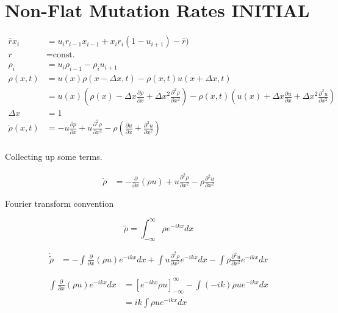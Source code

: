 \documentclass[a4paper]{article}
\begin{document}
\section{Non-Flat Mutation Rates INITIAL}

\begin{align*}
\bar{r} \dot{x}_i & = u_{i} r_{i-1} x_{i-1} + x_{i}  r_i ( 1- u_{i+1} ) - \bar{r} ) \\
r & = \text{const.} \\
\dot{\rho _i} & = u_i \rho _{i-1} - \rho _{i} u_{i+1} \\
\dot{\rho} (x, t) & = u(x) \rho (x - \Delta x, t) - \rho (x,t) u(x + \Delta x , t) \\
& = u(x) \left( \rho (x) - \Delta x \frac{\partial \rho}{\partial x} + \Delta x ^2 \frac{\partial ^2 \rho}{\partial x ^ 2} \right) - \rho (x, t) \left( u(x) + \Delta x \frac{\partial u}{\partial x} + \Delta x ^2 \frac{\partial ^2 u }{\partial x ^2} \right) \\
\Delta x & = 1 \\
\dot{\rho} (x, t) & = - u \frac{\partial \rho}{\partial x} + u \frac{\partial ^2 \rho}{\partial x ^2} - \rho \left( \frac{\partial u}{\partial x} + \frac{\partial ^2 u}{\partial x ^2} \right) \\
\end{align*}

Collecting up some terms. 

\begin{align*}
\dot{\rho} & = - \frac{\partial}{\partial x} ( \rho u ) + u \frac{\partial ^2 \rho}{\partial x ^2} - \rho \frac{\partial ^2 u}{\partial x ^2}
\end{align*}

Fourier transform convention 

\begin{equation}
\tilde{\rho} = \int _{- \infty} ^{\infty} \rho e ^{-ikx } dx 
\end{equation}

\begin{align*}
\dot{\tilde{\rho}} & = - \int \frac{\partial}{\partial x} (\rho u) e^{-ikx} dx + \int u \frac{\partial ^2 \rho}{\partial x^2} e^{-ikx} dx - \int \rho \frac{\partial ^2 u}{\partial x ^2 } e^{-ikx} dx
\end{align*}

\begin{align*}
\int \frac{\partial}{\partial x} (\rho u) e^{-ikx} dx & = \left[ e^{-ikx} \rho u \right] _{-\infty} ^{\infty} - \int (-ik) \rho u e^{-ikx} dx \\
& = ik \int \rho u e^{-ikx} dx
\end{align*}
\end{document}
